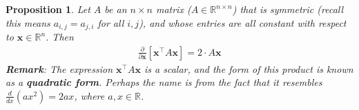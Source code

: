 \documentclass[12pt, a4paper]{article}
\newtheorem{proposition}{Proposition}
\theoremstyle{definition}
\begin{document}
	\begin{tcolorbox}
		\begin{proposition}
			Let $A$ be an $n\times n$ matrix ($A\in\mathbb{R}^{n\times n}$) that is symmetric
			(recall this means $a_{i,j}=a_{j,i}$ for all $i, j$), and whose entries are all
			constant with respect to $\mathbf{x}\in\mathbb{R}^n$. Then
			\begin{align}
				\frac{\partial }{\partial\mathbf{x}}[\mathbf{x}^\top A\mathbf{x}] = 2\cdot A\mathbf{x}
				\label{eqn:deriv-quad-form}
			\end{align}
			\textbf{Remark}: The expression $\mathbf{x}^\top A\mathbf{x}$ is a scalar, and the
			form of this product is known as a \textbf{quadratic form}. Perhaps the name is
			from the fact that it resembles $\frac{d}{dx}(ax^2)=2ax$, where $a,x\in\mathbb{R}$.
		\end{proposition}
	\end{tcolorbox}
	
\end{document}
